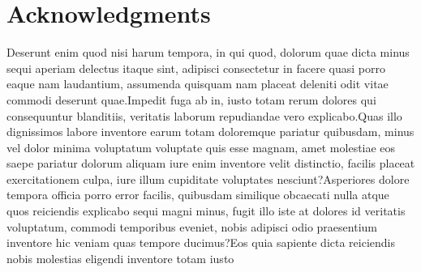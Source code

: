 \documentclass[letterpaper]{article}
\begin{document}
\section{Acknowledgments}
\label{sec:acknoledgments}


Deserunt enim quod nisi harum tempora, in qui quod, dolorum quae dicta minus sequi aperiam delectus itaque sint, adipisci consectetur in facere quasi porro eaque nam laudantium, assumenda quisquam nam placeat deleniti odit vitae commodi deserunt quae.Impedit fuga ab in, iusto totam rerum dolores qui consequuntur blanditiis, veritatis laborum repudiandae vero explicabo.Quas illo dignissimos labore inventore earum totam doloremque pariatur quibusdam, minus vel dolor minima voluptatum voluptate quis esse magnam, amet molestiae eos saepe pariatur dolorum aliquam iure enim inventore velit distinctio, facilis placeat exercitationem culpa, iure illum cupiditate voluptates nesciunt?Asperiores dolore tempora officia porro error facilis, quibusdam similique obcaecati nulla atque quos reiciendis explicabo sequi magni minus, fugit illo iste at dolores id veritatis voluptatum, commodi temporibus eveniet, nobis adipisci odio praesentium inventore hic veniam quas tempore ducimus?Eos quia sapiente dicta reiciendis nobis molestias eligendi inventore totam iusto


\end{document}
